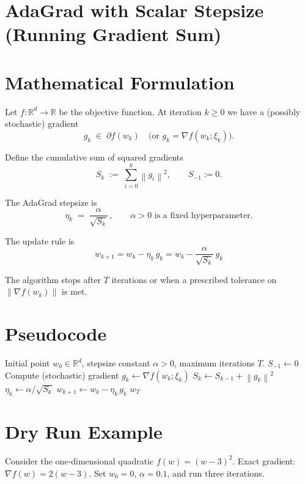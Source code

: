 \documentclass[11pt]{article}
\newcommand{\RR}{\mathbb{R}}
\newcommand{\norm}[1]{\left\|#1\right\|}
\begin{document}
\section*{AdaGrad with Scalar Stepsize (Running Gradient Sum)}

\section*{Mathematical Formulation}
Let $f:\RR^{d}\rightarrow\RR$ be the objective function.  
At iteration $k\ge 0$ we have a (possibly stochastic) gradient
\[
g_k\;\in\;\partial f(w_k)\quad\text{(or }g_k=\nabla f(w_k;\xi_k)\text{)} .
\]

Define the cumulative sum of squared gradients
\[
S_k \;:=\; \sum_{i=0}^{k} \norm{g_i}^2,\qquad S_{-1}:=0 .
\]

The AdaGrad stepsize is
\[
\eta_k \;=\; \frac{\alpha}{\sqrt{S_k}}\,,\qquad \alpha>0\text{ is a fixed hyperparameter}.
\]

The update rule is
\[
\boxed{\,w_{k+1}=w_k-\eta_k\, g_k
      = w_k-\frac{\alpha}{\sqrt{S_k}}\,g_k\, } \tag{1}
\]

The algorithm stops after $T$ iterations or when a prescribed tolerance on $\norm{\nabla f(w_k)}$ is met.

\section*{Pseudocode}
\begin{algorithm}[H]
\caption{Scalar AdaGrad}
\begin{algorithmic}[1]
\Require Initial point $w_0\in\RR^{d}$, stepsize constant $\alpha>0$, maximum iterations $T$.
\State $S_{-1}\gets 0$
    \State Compute (stochastic) gradient $g_k \gets \nabla f(w_k;\xi_k)$
    \State $S_k \gets S_{k-1}+ \norm{g_k}^2$
    \State $\eta_k \gets \alpha / \sqrt{S_k}$
    \State $w_{k+1} \gets w_k - \eta_k\, g_k$
\EndFor
\State \Return $w_T$
\end{algorithmic}
\end{algorithm}

\section*{Dry Run Example}
Consider the one‑dimensional quadratic $f(w)=(w-3)^2$.  
Exact gradient: $\nabla f(w)=2(w-3)$.  
Set $w_0=0$, $\alpha=0.1$, and run three iterations.
\end{document}
